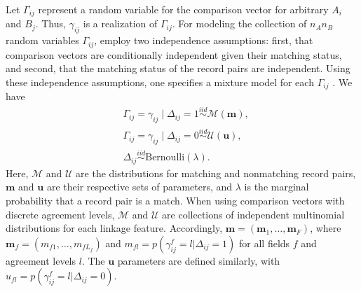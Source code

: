 \documentclass[ba]{imsart}
\begin{document}
Let $\Gamma_{ij}$ represent a random variable for the comparison vector for arbitrary $A_i$ and $B_j$.  Thus, $\gamma_{ij}$ is a realization of $\Gamma_{ij}$.  For modeling the collection of $n_An_B$ random variables $\Gamma_{ij}$, \cite{fellegi_theory_1969} employ two independence assumptions: first, that comparison vectors are conditionally independent given their matching status, and second, that the matching status of the record pairs are independent. Using these independence assumptions,  one specifies a mixture model for each $\Gamma_{ij}$ \citep[e.g., as in ][]{winkler_state_1999,jaro1989,larsen_2001,enamorado2019using}.  We have
\begin{subequations}
\begin{align}
&\Gamma_{ij} = \gamma_{ij} \mid \Delta_{ij} = 1 \stackrel{iid}{\sim} \mathcal{M}(\bm{m}), \label{eqn:fs_model} \\
&\Gamma_{ij} = \gamma_{ij} \mid \Delta_{ij} = 0  \stackrel{iid}{\sim} \mathcal{U}(\bm{u}), \label{eqn:m_dist}\\
&\Delta_{ij}   \stackrel{iid}{\sim} \text{Bernoulli}(\lambda). \label{eqn:lambda_dist}
\end{align}
\end{subequations}
Here, $\mathcal{M}$ and $\mathcal{U}$ are the distributions for matching and nonmatching record pairs, $\bm{m}$ and $\bm{u}$ are their respective sets of parameters, and $\lambda$ is the marginal probability that a record pair is a match. When using comparison vectors with discrete agreement levels, $\mathcal{M}$ and $\mathcal{U}$ are collections of independent multinomial distributions for each linkage feature. Accordingly, $\bm{m} = (\bm{m}_1, \ldots, \bm{m}_F)$, where $\bm{m}_f = (m_{f1}, \ldots, m_{fL_f})$ and $m_{fl} = p(\gamma_{ij}^f = l|\Delta_{ij} = 1)$ for all fields $f$ and agreement levels $l$. The $\bm{u}$ parameters are defined similarly, with $u_{fl} = p(\gamma_{ij}^f = l|\Delta_{ij} = 0)$.
\end{document}
